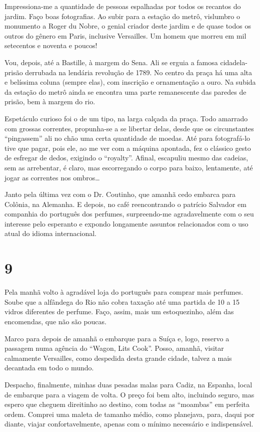 Impressiona-me a quantidade de pessoas espalhadas por todos os recantos do jardim. Faço boas fotografias. Ao subir para a estação do metrô, vislumbro o monumento a Roger du Nobre, o genial criador deste jardim e de quase todos os outros do gênero em Paris, inclusive Versailles. Um homem que morreu em mil setecentos e noventa e poucos!

Vou, depois, até a Bastille, à margem do Sena. Ali se erguia a famosa cidadela- prisão derrubada na lendária revolução de 1789. No centro da praça há uma alta e belíssima coluna (sempre elas), com inscrição e ornamentação a ouro. Na subida da estação do metrô ainda se encontra uma parte remanescente das paredes de prisão, bem à margem do rio.

Espetáculo curioso foi o de um tipo, na larga calçada da praça. Todo amarrado com grossas correntes, propunha-se a se libertar delas, desde que os circunstantes ``pingassem'' ali no chão uma certa quantidade de moedas. Até para fotografá-lo tive que pagar, pois ele, ao me ver com a máquina apontada, fez o clássico gesto de esfregar de dedos, exigindo o ``royalty''. Afinal, escapuliu mesmo das cadeias, sem as arrebentar, é claro, mas escorregando o corpo para baixo, lentamente, até jogar as correntes nos ombros\ldots

Janto pela última vez com o Dr. Coutinho, que amanhã cedo embarca para Colônia, na Alemanha. E depois, no café reencontrando o patrício Salvador em companhia do português dos perfumes, surpreendo-me agradavelmente com o seu interesse pelo esperanto e expondo longamente assuntos relacionados com o uso atual do idioma internacional.

\section*{9 \adfflatleafright {}}
Pela manhã volto à agradável loja do português para comprar mais perfumes. Soube que a alfândega do Rio não cobra taxação até uma partida de 10 a 15 vidros diferentes de perfume. Faço, assim, mais um estoquezinho, além das encomendas, que não são poucas.

Marco para depois de amanhã o embarque para a Suíça e, logo, reservo a passagem numa agência do ``Wagon, Lits Cook''. Posso, amanhã, visitar calmamente Versailles, como despedida desta grande cidade, talvez a mais decantada em todo o mundo.

Despacho, finalmente, minhas duas pesadas malas para Cadiz, na Espanha, local de embarque para a viagem de volta. O preço foi bem alto, incluindo seguro, mas espero que cheguem direitinho ao destino, com todas as ``moambas'' em perfeita ordem. Comprei uma maleta de tamanho médio, como planejava, para, daqui por diante, viajar confortavelmente, apenas com o mínimo necessário e indispensável.

